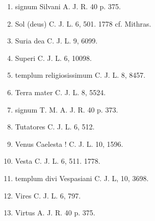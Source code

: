 \documentclass[a4paper, 11pt, oneside, polutonikogreek, german]{article}
\begin{document}
\begin{enumerate}
\item signum Silvani A. J. R. 40 p. 375.

\item Sol (deus) C. J. L. 6, 501. 1778 cf. Mithras.

\item Suria dea C. J. L. 9, 6099.

\item Superi C. J. L. 6, 10098.

\item templum religiosissimum C. J. L. 8, 8457.

\item Terra mater C. J. L. 8, 5524.

\item signum T. M. A. J. R. 40 p. 373.

\item Tutatores C. J. L. 6, 512.

\item Venus Caelesta ! C. J. L. 10, 1596.

\item Vesta C. J. L. 6, 511. 1778.

\item templum divi Vespasiani C. J. L, 10, 3698.

\item Vires C. J. L. 6, 797.

\item Virtus A. J. R. 40 p. 375.
\end{enumerate}
\end{document}
